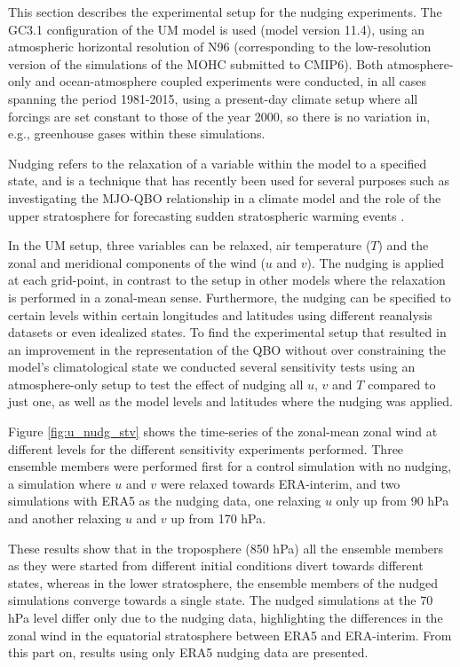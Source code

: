 This section describes the experimental setup for the nudging experiments. 
The GC3.1 configuration of the UM model is used (model version 11.4), using an atmospheric horizontal resolution of N96 (corresponding to the low-resolution version of the simulations of the MOHC submitted to CMIP6). 
Both atmosphere-only and ocean-atmosphere coupled experiments were conducted, in all cases spanning the period 1981-2015, using a present-day climate setup where all forcings are set constant to those of the year 2000, so there is no variation in, e.g., greenhouse gases within these simulations.

Nudging refers to the relaxation of a variable within the model to a specified state, and is a technique that has recently been used for several purposes such as investigating the MJO-QBO relationship in a climate model \citep{martin2021} and the role of the upper stratosphere for forecasting sudden stratospheric warming events \citep{gray2020}.

In the UM setup, three variables can be relaxed, air temperature ($T$) and the zonal and meridional components of the wind ($u$ and $v$). The nudging is applied at each grid-point, in contrast to the setup in other models \citep[e.g.][]{martin2021} where the relaxation is performed in a zonal-mean sense. Furthermore, the nudging can be specified to certain levels within certain longitudes and latitudes using different reanalysis datasets or even idealized states. To find the experimental setup that resulted in an improvement in the representation of the QBO without over constraining the model's climatological state we conducted several sensitivity tests using an atmosphere-only setup to test the effect of nudging all $u$, $v$ and $T$ compared to just one, as well as the model levels and latitudes where the nudging was applied. 


Figure \ref{fig:u_nudg_stv} shows the time-series of the zonal-mean zonal wind at different levels for the different sensitivity experiments performed. Three ensemble members were performed first for a control simulation with no nudging, a simulation where $u$ and $v$ were relaxed towards ERA-interim, and two simulations with ERA5 as the nudging data, one relaxing $u$ only up from 90 hPa and another relaxing $u$ and $v$ up from 170 hPa. 


These results show that in the troposphere (850 hPa) all the ensemble members as they were started from different initial conditions divert towards different states, whereas in the lower stratosphere, the ensemble members of the nudged simulations converge towards a single state. The nudged simulations at the 70 hPa level differ only due to the nudging data, highlighting the differences in the zonal wind in the equatorial stratosphere between ERA5 and ERA-interim. 
From this part on, results using only ERA5 nudging data are presented. 


